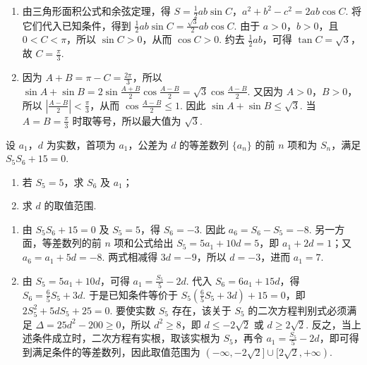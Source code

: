 \begin{solution}
\begin{enumerate}
\item 由三角形面积公式和余弦定理，得
\(S = \frac{1}{2}ab\sin C\)，\(a^2+b^2-c^2=2ab\cos C\). 将它们代入已知条件，得到
\(\frac{1}{2}ab\sin C=\frac{\sqrt{3}}{2}ab\cos C\). 由于 \(a>0\)，\(b>0\)，且 \(0<C<\pi\)，所以 \(\sin C>0\)，从而 \(\cos C>0\). 约去 \(\frac{1}{2}ab\)，可得 \(\tan C=\sqrt{3}\)，故 \(C=\frac{\pi}{3}\).
\item 因为 \(A+B=\pi-C=\frac{2\pi}{3}\)，所以
\(\sin A+\sin B=2\sin\frac{A+B}{2}\cos\frac{A-B}{2}=\sqrt{3}\cos\frac{A-B}{2}\). 又因为 \(A>0\)，\(B>0\)，所以 \(\left|\frac{A-B}{2}\right|<\frac{\pi}{3}\)，从而 \(\cos\frac{A-B}{2}\leqslant1\). 因此 \(\sin A+\sin B\leqslant\sqrt{3}\). 当 \(A=B=\frac{\pi}{3}\) 时取等号，所以最大值为 \(\sqrt{3}\).
\end{enumerate}
\end{solution}

\begin{problem}
设 \(a_1\)，\(d\) 为实数，首项为 \(a_1\)，公差为 \(d\) 的等差数列 \(\{a_n\}\) 的前 \(n\) 项和为 \(S_n\)，满足 \(S_5S_6 + 15 = 0\).

\begin{enumerate}
\item 若 \(S_5 = 5\)，求 \(S_6\) 及 \(a_1\)；
\item 求 \(d\) 的取值范围.
\end{enumerate}
\end{problem}

\begin{solution}
\begin{enumerate}
\item 由 \(S_5S_6+15=0\) 及 \(S_5=5\)，得 \(S_6=-3\). 因此 \(a_6=S_6-S_5=-8\). 另一方面，等差数列的前 \(n\) 项和公式给出
\(S_5=5a_1+10d=5\)，即 \(a_1+2d=1\)；又 \(a_6=a_1+5d=-8\). 两式相减得 \(3d=-9\)，所以 \(d=-3\)，进而 \(a_1=7\).
\item 由 \(S_5=5a_1+10d\)，可得 \(a_1=\frac{S_5}{5}-2d\). 代入 \(S_6=6a_1+15d\)，得 \(S_6=\frac{6}{5}S_5+3d\). 于是已知条件等价于
\(S_5\left(\frac{6}{5}S_5+3d\right)+15=0\)，即
\(2S_5^2+5dS_5+25=0\). 要使实数 \(S_5\) 存在，该关于 \(S_5\) 的二次方程判别式必须满足
\(\Delta=25d^2-200\geqslant0\)，所以 \(d^2\geqslant8\)，即 \(d\leqslant-2\sqrt{2}\) 或 \(d\geqslant2\sqrt{2}\). 反之，当上述条件成立时，二次方程有实根，取该实根为 \(S_5\)，再令 \(a_1=\frac{S_5}{5}-2d\)，即可得到满足条件的等差数列，因此取值范围为 \((-\infty,-2\sqrt{2}]\cup[2\sqrt{2},+\infty)\).
\end{enumerate}
\end{solution}

